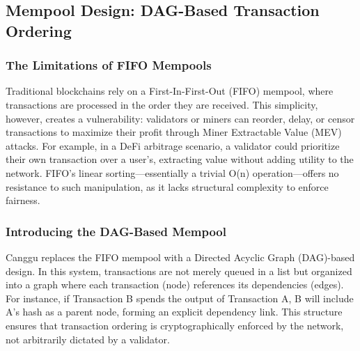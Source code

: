 \documentclass[12pt]{article}
\begin{document}
\subsection{Mempool Design: DAG-Based Transaction Ordering}
\subsubsection{The Limitations of FIFO Mempools}
\begin{justify}
Traditional blockchains rely on a First-In-First-Out (FIFO) mempool, where transactions are processed in the order they are received. This simplicity, however, creates a vulnerability: validators or miners can reorder, delay, or censor transactions to maximize their profit through Miner Extractable Value (MEV) attacks. For example, in a DeFi arbitrage scenario, a validator could prioritize their own transaction over a user’s, extracting value without adding utility to the network. FIFO’s linear sorting—essentially a trivial O(n) operation—offers no resistance to such manipulation, as it lacks structural complexity to enforce fairness.    
\end{justify}


\subsubsection{Introducing the DAG-Based Mempool}
\begin{justify}
    Canggu replaces the FIFO mempool with a Directed Acyclic Graph (DAG)-based design. In this system, transactions are not merely queued in a list but organized into a graph where each transaction (node) references its dependencies (edges). For instance, if Transaction B spends the output of Transaction A, B will include A’s hash as a parent node, forming an explicit dependency link. This structure ensures that transaction ordering is cryptographically enforced by the network, not arbitrarily dictated by a validator.
\end{justify}
\end{document}
